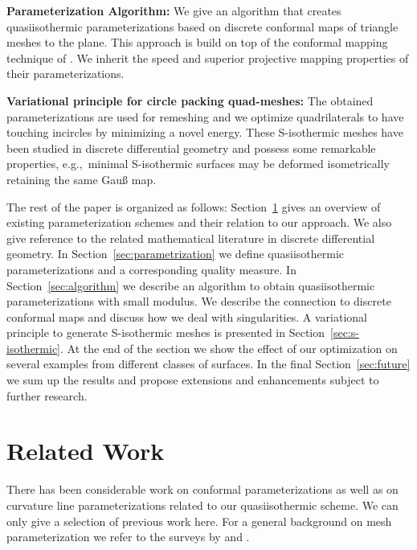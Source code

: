 \documentclass[twoside]{article}
\begin{document}
\noindent\textbf{Parameterization Algorithm:}
We give an algorithm that creates quasiisothermic parameterizations based on discrete
conformal maps of triangle meshes to the plane. This approach is build on top 
of the conformal mapping technique of \cite{Springborn:2008:CET}. We
inherit the speed and superior projective mapping properties of their 
parameterizations.

\noindent\textbf{Variational principle for circle packing quad-meshes:}
The obtained parameterizations are used for remeshing and we optimize 
quadrilaterals to have touching incircles by minimizing a novel energy. These
S-isothermic meshes have been studied in discrete differential geometry and
possess some remarkable properties, e.g.,\ minimal S-isothermic surfaces may be
deformed isometrically retaining the same Gau{\ss} map.


The rest of the paper is organized as follows: Section~\ref{sec:previouswork}
gives an overview of existing parameterization schemes and their relation to
our approach. We also give reference to the related mathematical literature in
discrete differential geometry. In Section~\ref{sec:parametrization} we define
quasiisothermic parameterizations and a corresponding quality measure. 
In Section~\ref{sec:algorithm} we describe an algorithm to
obtain quasiisothermic parameterizations with small modulus. We describe the 
connection to discrete conformal maps and discuss how we deal with singularities. %
A variational principle to generate S-isothermic meshes is presented in
Section~\ref{sec:s-isothermic}. At the end of the section we show the effect of
our optimization on several examples from different classes of surfaces. In the
final Section~\ref{sec:future} we sum up the results and propose extensions and
enhancements subject to further research.

\section{Related Work}
\label{sec:previouswork}

There has been considerable work on conformal parameterizations as well as on
curvature line parameterizations related to our quasiisothermic scheme. We can 
only give a selection of previous work here.
For a general background on mesh parameterization we refer to the surveys by
\cite{Floater:2005:SPA} and \cite{ShefferPR06}.
\end{document}
